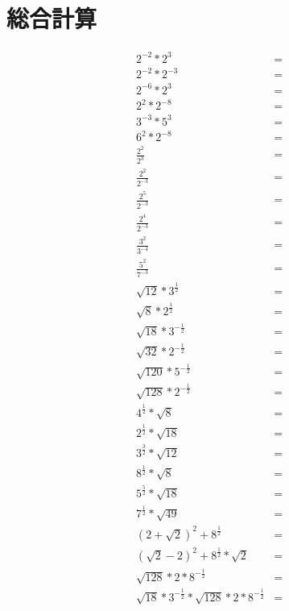 \documentclass[paper=b4j,landscape,twocolumn,fleqn]{jlreq}
\begin{document}
\section{総合計算}
\begin{align*}
  2^{-2}*2^3 &=\\
  2^{-2}*2^{-3} &=\\
  2^{-6}*2^3 &=\\
  2^2*2^{-8} &=\\
  3^{-3}*5^3 &=\\
  6^2*2^{-8} &=\\
  \frac{2^2}{2^3} &=\\
  \frac{2^2}{2^{-3}} &=\\
  \frac{2^5}{2^{-3}} &=\\
  \frac{2^4}{2^{-3}} &=\\
  \frac{3^2}{3^{-4}} &=\\
  \frac{5^2}{7^{-3}} &=\\
  \sqrt{12}*3^{\frac{1}{2}} &=\\
  \sqrt{8}*2^{\frac{1}{2}} &=\\
  \sqrt{18}*3^{-\frac{1}{2}} &=\\
  \sqrt{32}*2^{-\frac{1}{2}} &=\\
  \sqrt{120}*5^{-\frac{1}{2}} &=\\
  \sqrt{128}*2^{-\frac{1}{2}} &=\\
  4^{\frac{1}{2}}*\sqrt{8} &=\\
  2^{\frac{1}{2}}*\sqrt{18} &=\\
  3^{\frac{3}{2}}*\sqrt{12} &=\\
  8^{\frac{1}{2}}*\sqrt{8} &=\\
  5^{\frac{5}{2}}*\sqrt{18} &=\\
  7^{\frac{1}{2}}*\sqrt{49} &=\\
  (2+\sqrt{2})^2+8^{\frac{1}{2}} &=\\
  (\sqrt{2}-2)^2+8^{\frac{1}{2}}*\sqrt{2} &=\\
  \sqrt{128}*2*8^{-\frac{1}{2}} &=\\
  \sqrt{18}*3^{-\frac{1}{2}}*\sqrt{128}*2*8^{-\frac{1}{2}} &=\\
\end{align*}
\end{document}
